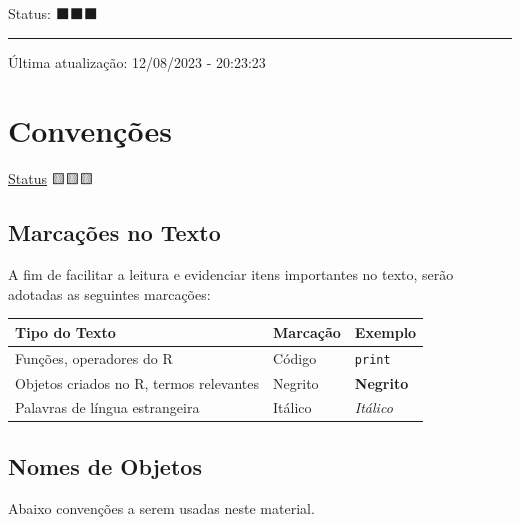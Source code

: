 \documentclass[
  letterpaper,
  DIV=11,
  numbers=noendperiod]{scrreprt}
\begin{document}
Status: ⬛⬛⬛

\begin{center}\rule{0.5\linewidth}{0.5pt}\end{center}

Última atualização: 12/08/2023 - 20:23:23


\hypertarget{convenuxe7uxf5es-1}{%
\chapter*{Convenções}\label{convenuxe7uxf5es-1}}


\protect\hyperlink{status-do-material}{Status} 🟨🟨🟨

\hypertarget{marcauxe7uxf5es-no-texto}{%
\section*{Marcações no Texto}\label{marcauxe7uxf5es-no-texto}}


A fim de facilitar a leitura e evidenciar itens importantes no texto,
serão adotadas as seguintes marcações:

\begin{longtable}[]{@{}lll@{}}
\toprule()
Tipo do Texto & Marcação & Exemplo \\
\midrule()
\endhead
Funções, operadores do R & Código & \texttt{print} \\
Objetos criados no R, termos relevantes & Negrito & \textbf{Negrito} \\
Palavras de língua estrangeira & Itálico & \emph{Itálico} \\
\bottomrule()
\end{longtable}

\hypertarget{nomes-de-objetos}{%
\section*{Nomes de Objetos}\label{nomes-de-objetos}}


Abaixo convenções a serem usadas neste material.
\end{document}
